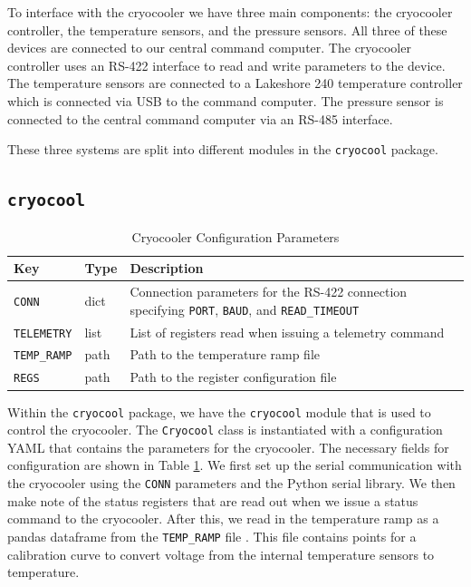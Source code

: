 To interface with the cryocooler we have three main components: the cryocooler controller, the temperature sensors, and the pressure sensors.
All three of these devices are connected to our central command computer. 
The cryocooler controller uses an RS-422 interface to read and write parameters to the device.
The temperature sensors are connected to a Lakeshore 240 temperature controller which is connected via USB to the command computer.
The pressure sensor is connected to the central command computer via an RS-485 interface.

These three systems are split into different modules in the \texttt{cryocool} package.

\subsection{\texttt{cryocool}}
\begin{table}
    \centering
    \begin{tabularx}{\textwidth}{l|l|X}
        \textbf{Key} & \textbf{Type} & \textbf{Description} \\ \hline    
        \texttt{CONN} & dict & Connection parameters for the RS-422 connection specifying \texttt{PORT}, \texttt{BAUD}, and \texttt{READ\_TIMEOUT} \\
        \texttt{TELEMETRY} & list & List of registers read when issuing a telemetry command \\
        \texttt{TEMP\_RAMP} & path & Path to the temperature ramp file \\
        \texttt{REGS} & path & Path to the register configuration file
    \end{tabularx}
    \caption{Cryocooler Configuration Parameters}
    \label{readout/table:cryocool_config}
\end{table}

Within the \texttt{cryocool} package, we have the \texttt{cryocool} module that is used to control the cryocooler.
The \texttt{Cryocool} class is instantiated with a configuration YAML that contains the parameters for the cryocooler. 
The necessary fields for configuration are shown in Table \ref{readout/table:cryocool_config}.
We first set up the serial communication with the cryocooler using the \texttt{CONN} parameters and the Python serial library.
We then make note of the status registers that are read out when we issue a status command to the cryocooler.
After this, we read in the temperature ramp as a pandas dataframe from the \texttt{TEMP\_RAMP} file \parencite{reback2020pandas}.
This file contains points for a calibration curve to convert voltage from the internal temperature sensors to temperature.

